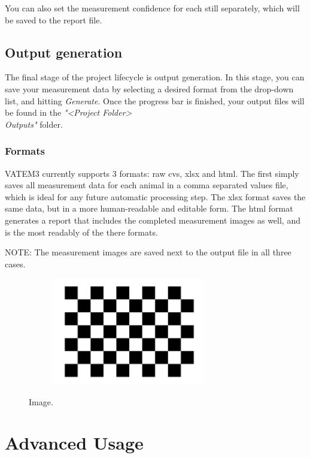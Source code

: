 \documentclass[10pt,a4paper,oneside]{report}             %
\begin{document}
You can also set the measurement confidence for each still separately, which will be saved to the report file.

\section{Output generation}

The final stage of the project lifecycle is output generation. In this stage, you can save your measurement data by selecting a desired format from the drop-down list, and hitting \textit{Generate}. Once the progress bar is finished, your output files will be found in the \textit{"<Project Folder>\\Outputs"} folder.

\subsection{Formats}

VATEM3 currently supports 3 formats: raw cvs, xlsx and html. The first simply saves all measurement data for each animal in a comma separated values file, which is ideal for any future automatic processing step. The xlsx format saves the same data, but in a more human-readable and editable form. The html format generates a report that includes the completed measurement images as well, and is the most readably of the there formats. 

NOTE: The measurement images are saved next to the output file in all three cases.
 

\begin{figure}[!htb]
\centering
\begin{subfigure}{\textwidth}
\centering 
\includegraphics[height=4.7cm]{../VAM/Icons/chessboard.png}
\end{subfigure}
\caption[]
{\small  Image.}
\end{figure} 


\chapter{Advanced Usage}
\end{document}
